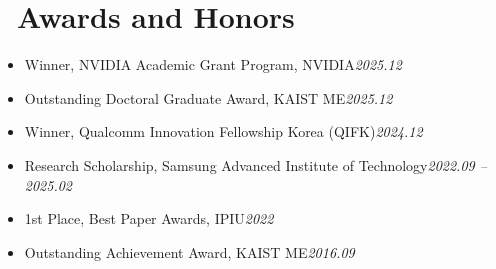 \documentclass[a4paper,11pt]{article}
\begin{document}
\section{\faTrophy\ Awards and Honors}
\begin{itemize}[leftmargin=0.25cm]
    \item Winner, NVIDIA Academic Grant Program, NVIDIA\hfill \textit{2025.12}
    \item Outstanding Doctoral Graduate Award, KAIST ME\hfill \textit{2025.12}
    \item Winner, Qualcomm Innovation Fellowship Korea (QIFK)\hfill \textit{2024.12}
    \item Research Scholarship, Samsung Advanced Institute of Technology\hfill \textit{2022.09 -- 2025.02}
    \item 1st Place, Best Paper Awards, IPIU\hfill \textit{2022}
    \item Outstanding Achievement Award, KAIST ME\hfill \textit{2016.09}
\end{itemize}





\end{document}

